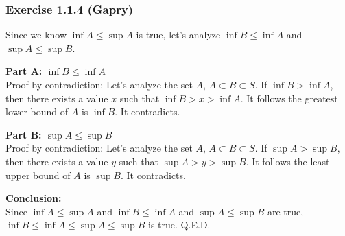 \subsubsection*{Exercise 1.1.4 (Gapry)}

\begin{flushleft}
Since we know $\inf A \le \sup A$ is true, let's analyze $\inf B \le \inf A$ and $\sup A \le \sup B$.

\textbf{Part A: $\inf B \le \inf A$} \\
Proof by contradiction: 
Let's analyze the set $A$, $A \subset B \subset S$. If $\inf B > \inf A$, 
then there exists a value $x$ such that $\inf B > x > \inf A$. 
It follows the greatest lower bound of $A$ is $\inf B$.
It contradicts.

\textbf{Part B: $\sup A \le \sup B$} \\
Proof by contradiction: 
Let's analyze the set $A$, $A \subset B \subset S$. If $\sup A > \sup B$, 
then there exists a value $y$ such that $\sup A > y > \sup B$. 
It follows the least upper bound of $A$ is $\sup B$.
It contradicts.

\textbf{Conclusion:} \\
Since $\inf A \le \sup A$ and $\inf B \le \inf A$ and $\sup A \le \sup B$ are true, 
$\inf B \le \inf A \le \sup A \le \sup B$ is true. Q.E.D.
\end{flushleft}
